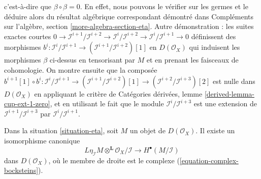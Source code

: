 c'est-à-dire que $\beta \circ \beta = 0$. En effet, nous pouvons le vérifier sur les germes et le déduire alors du résultat algébrique correspondant démontré dans Compléments sur l'algèbre, section \ref{more-algebra-section-eta}. Autre démonstration : les suites exactes courtes
$0 \to \mathcal{I}^{i + 1}/\mathcal{I}^{i + 2}
\to \mathcal{I}^i/\mathcal{I}^{i + 2}
\to \mathcal{I}^i/\mathcal{I}^{i + 1} \to 0$
définissent des morphismes
$b^i : \mathcal{I}^i/\mathcal{I}^{i + 1} \to
(\mathcal{I}^{i + 1}/\mathcal{I}^{i + 2})[1]$
en $D(\mathcal{O}_X)$
qui induisent les morphismes $\beta$ ci-dessus en tensorisant par $M$
et en prenant les faisceaux de cohomologie. On montre ensuite que la composée
$b^{i + 1}[1] \circ b^i : \mathcal{I}^i/\mathcal{I}^{i + 1} \to
(\mathcal{I}^{i + 1}/\mathcal{I}^{i + 2})[1] \to
(\mathcal{I}^{i + 2}/\mathcal{I}^{i + 3})[2]$
est nulle dans $D(\mathcal{O}_X)$ en appliquant le critère de Catégories dérivées, lemme \ref{derived-lemma-cup-ext-1-zero},
et en utilisant le fait que le module $\mathcal{I}^i/\mathcal{I}^{i + 3}$
est une extension de $\mathcal{I}^{i + 1}/\mathcal{I}^{i + 3}$
par $\mathcal{I}^i/\mathcal{I}^{i + 1}$.

\begin{lemma}

\label{lemma-eta-second-property}

Dans la situation \ref{situation-eta}, soit $M$ un objet de
$D(\mathcal{O}_X)$. Il existe un isomorphisme canonique
$$
L\eta_\mathcal{I}M \otimes^\mathbf{L} \mathcal{O}_X/\mathcal{I}
\longrightarrow
H^\bullet(M/\mathcal{I})
$$
dans $D(\mathcal{O}_X)$, où le membre de droite est le complexe (\ref{equation-complex-bocksteins}).

\end{lemma}

